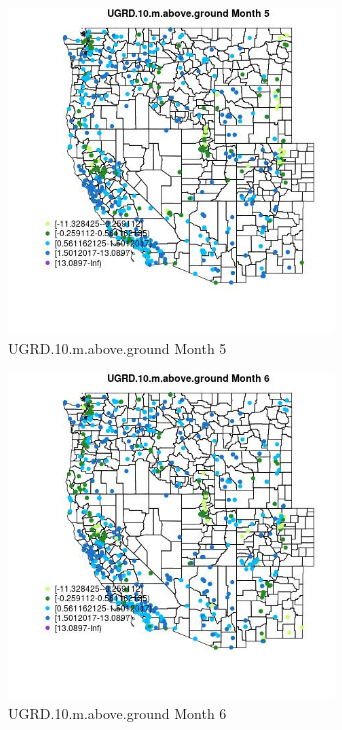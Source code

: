 \begin{figure} 
\centering  
\includegraphics[width=0.77\textwidth]{Code_Outputs/Report_ML_input_PM25_Step4_part_e_de_duplicated_aves_compiled_2019-05-14wNAs_MapObsMo5UGRD10maboveground.jpg} 
\caption{\label{fig:Report_ML_input_PM25_Step4_part_e_de_duplicated_aves_compiled_2019-05-14wNAsMapObsMo5UGRD10maboveground}UGRD.10.m.above.ground Month 5} 
\end{figure} 
 

\begin{figure} 
\centering  
\includegraphics[width=0.77\textwidth]{Code_Outputs/Report_ML_input_PM25_Step4_part_e_de_duplicated_aves_compiled_2019-05-14wNAs_MapObsMo6UGRD10maboveground.jpg} 
\caption{\label{fig:Report_ML_input_PM25_Step4_part_e_de_duplicated_aves_compiled_2019-05-14wNAsMapObsMo6UGRD10maboveground}UGRD.10.m.above.ground Month 6} 
\end{figure} 
 

